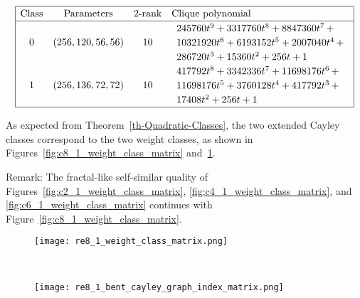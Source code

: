 \documentclass[12pt,a4paper]{article}
\begin{document}
\begin{table}[!bhpt] %
%
\small{}
\begin{align*}
\def\arraystretch{1.2}
\begin{array}{|cccl|}
\hline
\text{Class} &
\text{Parameters} &
\text{2-rank} &
\text{Clique polynomial}
\\
\hline
0 &
(256, 120, 56, 56) &
10 &
\begin{array}{l}
245760t^{9} + 3317760t^{8} + 8847360t^{7}
\,+
\\
 10321920t^{6} + 6193152t^{5} + 2007040t^{4}
\,+
\\
 286720t^{3} + 15360t^{2} + 256t + 1
\end{array}
\\
1 &
(256, 136, 72, 72) &
10 &
\begin{array}{l}
417792t^{8} + 3342336t^{7} + 11698176t^{6}
\,+
\\
 11698176t^{5} + 3760128t^{4} + 417792t^{3}
\,+
\\
 17408t^{2} + 256t + 1
\end{array}
\\
\hline
\end{array}
\end{align*}
%
\caption{$[f_{8,1}]$ extended Cayley classes.}
\label{tab-c8_1_EC_classes}
\end{table}

As expected from Theorem~\ref{th-Quadratic-Classes},
the two extended Cayley classes correspond to the two weight classes,
as shown in Figures~\ref{fig:c8_1_weight_class_matrix} and~\ref{fig:c8_1_bent_cayley_graph_index_matrix}.

Remark: The fractal-like self-similar quality of Figures~\ref{fig:c2_1_weight_class_matrix}, \ref{fig:c4_1_weight_class_matrix},
and \ref{fig:c6_1_weight_class_matrix} continues with Figure~\ref{fig:c8_1_weight_class_matrix}.

\begin{figure}[!bhpt] %
\centering
\begin{minipage}{.48\textwidth}
  \centering
  \texttt{[image: re8\_1\_weight\_class\_matrix.png]}
  \label{fig:c8_1_weight_class_matrix}
\end{minipage}%
~~~~
\begin{minipage}{.48\textwidth}
  \centering
  \texttt{[image: re8\_1\_bent\_cayley\_graph\_index\_matrix.png]}
  \label{fig:c8_1_bent_cayley_graph_index_matrix}
\end{minipage}
\end{figure}
\end{document}
